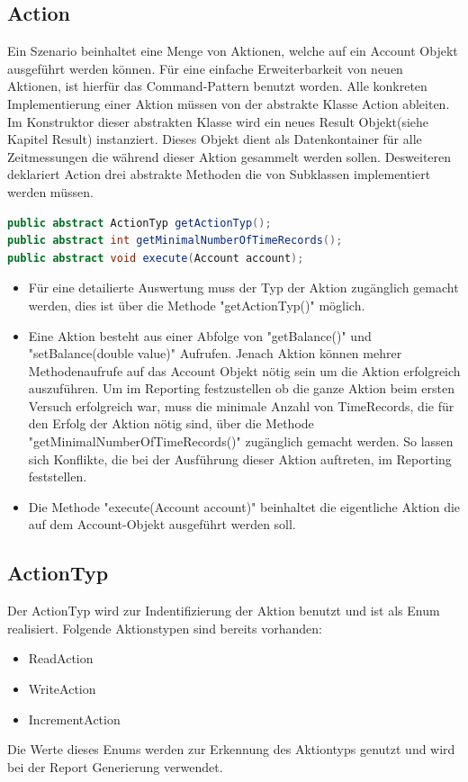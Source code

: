 \subsection{Action}
\label{sec:action}
Ein Szenario beinhaltet eine Menge von Aktionen, welche auf ein Account Objekt ausgeführt werden können. Für eine einfache Erweiterbarkeit von neuen Aktionen, ist hierfür das Command-Pattern benutzt worden. Alle konkreten Implementierung einer Aktion müssen von der abstrakte Klasse Action ableiten. Im Konstruktor dieser abstrakten Klasse wird ein neues Result Objekt(siehe Kapitel Result) instanziert. Dieses Objekt dient als Datenkontainer für alle Zeitmessungen die während dieser Aktion gesammelt werden sollen. Desweiteren deklariert Action drei abstrakte Methoden die von Subklassen implementiert werden müssen.
\begin{lstlisting}[language=java, breaklines=true] 	
public abstract ActionTyp getActionTyp();
public abstract int getMinimalNumberOfTimeRecords();
public abstract void execute(Account account);	
\end{lstlisting}

\begin{itemize}
\item Für eine detailierte Auswertung muss der Typ der Aktion zugänglich gemacht werden, dies ist über die Methode "getActionTyp()" möglich.
\item Eine Aktion besteht aus einer Abfolge von "getBalance()" und "setBalance(double value)" Aufrufen. Jenach Aktion können mehrer Methodenaufrufe auf das Account Objekt nötig sein um die Aktion erfolgreich auszuführen. Um im Reporting festzustellen ob die ganze Aktion beim ersten Versuch erfolgreich war, muss die minimale Anzahl von TimeRecords, die für den Erfolg der Aktion nötig sind, über die Methode "getMinimalNumberOfTimeRecords()" zugänglich gemacht werden. So lassen sich Konflikte, die bei der Ausführung dieser Aktion auftreten, im Reporting feststellen.
\item Die Methode "execute(Account account)" beinhaltet die eigentliche Aktion die auf dem Account-Objekt ausgeführt werden soll.
\end{itemize} 

\subsection{ActionTyp}
\label{sec:actionTyp}
Der ActionTyp wird zur Indentifizierung der Aktion benutzt und ist als Enum realisiert. Folgende Aktionstypen sind bereits vorhanden:
\begin{itemize}
\item ReadAction
\item WriteAction
\item IncrementAction
\end{itemize}
Die Werte dieses Enums werden zur Erkennung des Aktiontyps genutzt und wird bei der Report Generierung verwendet.

